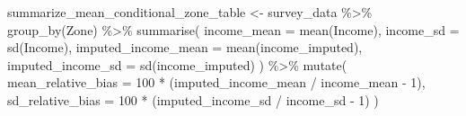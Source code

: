 \documentclass[
  spanish,
  11pt,
  letterpaper,
  oneside,
  open=any]{scrbook}
\newenvironment{Shaded}{\begin{snugshade}}{\end{snugshade}}
\newcommand{\AttributeTok}[1]{\textcolor[rgb]{0.40,0.45,0.13}{#1}}
\newcommand{\DecValTok}[1]{\textcolor[rgb]{0.68,0.00,0.00}{#1}}
\newcommand{\FunctionTok}[1]{\textcolor[rgb]{0.28,0.35,0.67}{#1}}
\newcommand{\NormalTok}[1]{\textcolor[rgb]{0.00,0.23,0.31}{#1}}
\newcommand{\OtherTok}[1]{\textcolor[rgb]{0.00,0.23,0.31}{#1}}
\newcommand{\SpecialCharTok}[1]{\textcolor[rgb]{0.37,0.37,0.37}{#1}}
\begin{document}
\begin{Shaded}
\begin{Highlighting}[]
\NormalTok{summarize\_mean\_conditional\_zone\_table }\OtherTok{\textless{}{-}}\NormalTok{ survey\_data }\SpecialCharTok{\%\textgreater{}\%}
  \FunctionTok{group\_by}\NormalTok{(Zone) }\SpecialCharTok{\%\textgreater{}\%}
  \FunctionTok{summarise}\NormalTok{(}
    \AttributeTok{income\_mean =} \FunctionTok{mean}\NormalTok{(Income),}
    \AttributeTok{income\_sd =} \FunctionTok{sd}\NormalTok{(Income),}
    \AttributeTok{imputed\_income\_mean =} \FunctionTok{mean}\NormalTok{(income\_imputed),}
    \AttributeTok{imputed\_income\_sd =} \FunctionTok{sd}\NormalTok{(income\_imputed)}
\NormalTok{  ) }\SpecialCharTok{\%\textgreater{}\%}
  \FunctionTok{mutate}\NormalTok{(}
    \AttributeTok{mean\_relative\_bias =} \DecValTok{100} \SpecialCharTok{*}\NormalTok{ (imputed\_income\_mean }\SpecialCharTok{/}\NormalTok{ income\_mean }\SpecialCharTok{{-}} \DecValTok{1}\NormalTok{),}
    \AttributeTok{sd\_relative\_bias =} \DecValTok{100} \SpecialCharTok{*}\NormalTok{ (imputed\_income\_sd }\SpecialCharTok{/}\NormalTok{ income\_sd }\SpecialCharTok{{-}} \DecValTok{1}\NormalTok{)}
\NormalTok{  )}
\end{Highlighting}
\end{Shaded}
\end{document}
